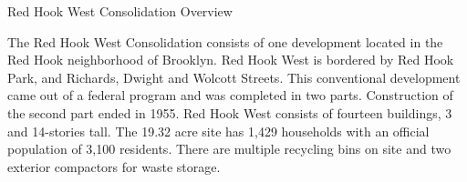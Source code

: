 Red Hook West Consolidation Overview

The Red Hook West Consolidation consists of one development located in the Red Hook neighborhood of Brooklyn. Red Hook West is bordered by Red Hook Park, and Richards, Dwight and Wolcott Streets. This conventional development came out of a federal program and was completed in two parts. Construction of the second part ended in 1955. Red Hook West consists of fourteen buildings, 3 and 14-stories tall. The 19.32 acre site has 1,429 households with an official population of 3,100 residents. There are multiple recycling bins on site and two exterior compactors for waste storage.